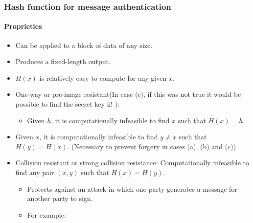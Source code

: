 \documentclass{article}
\begin{document}
                            \newpage
                            \subsubsection{Hash function for message authentication}
                                \paragraph{Proprieties}
                                \begin{itemize}
                                    \item Can be applied to a block of data of any size.
                                    \item Produces a fixed-length output.
                                    \item \( H(x) \) is relatively easy to compute for any given \( x \).
                                    \item One-way or pre-image resistant(In case (c), if this was not true it would be
                                    possible to find the secret key k! ):
                                    \begin{itemize}
                                        \item Given \( h \), it is computationally infeasible to find \( x \) such that \( H(x) = h \).
                                    \end{itemize}
                                    \item Given \( x \), it is computationally infeasible to find \( y \neq x \) such that \( H(y) = H(x) \).
                                          (Necessary to prevent forgery in cases (a), (b)
                                          and (c))
                                    \item Collision resistant or strong collision resistance:
                                         Computationally infeasible to find any pair \( (x,y) \) such that \( H(x) = H(y) \).
                                        \begin{itemize}
                                            \item Protects against an attack in which one party generates a message for another party to sign.
                                            \item For example:
                                            \begin{itemize}

\end{itemize}
\end{itemize}
\end{itemize}
\end{document}
